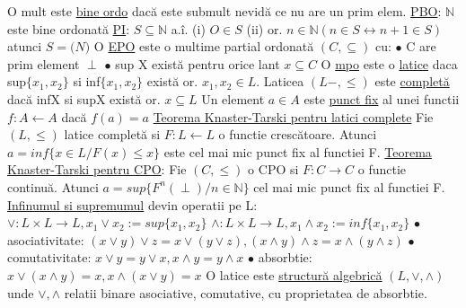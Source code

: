 \documentclass[8pt,twocolumn]{extarticle}
\begin{document}
	O mult este \underline{bine ordo} dacă este submult nevidă ce nu are un prim elem. \newline
	\underline{PBO}: $\mathbb{N}$ este bine ordonată \newline
	\underline{PI}: $S \subseteq \mathbb{N}$ a.î. (i) $O \in S$ \newline
	(ii) or. $n \in \mathbb{N} (n \in S \leftrightarrow n + 1 \in S)$ atunci $S = \mathbb(N)$ \newline
	O \underline{EPO} este o multime partial ordonată $(C, \subseteq)$ cu: \newline
	$\bullet$ C are prim element $\perp$ $\bullet$ sup X există pentru orice lant $x \subseteq C$ \newline
	O \underline{mpo} este o \underline{latice} daca sup$\{x_{1}, x_{2}\}$ si inf$\{x_{1}, x_{2}\}$ există or. $x_{1}, x_{2} \in L$. Laticea $(L-, \leq)$ este \underline{completă} dacă infX si supX există or. $x \subseteq L$ \newline
	Un element $a \in A$ este \underline{punct fix} al unei functii $f: A \leftarrow A$ dacă $f(a) = a$ \newline
	\underline{Teorema Knaster-Tarski pentru latici complete} \newline
	Fie $(L, \leq)$ latice completă si $F: L \leftarrow L$ o functie crescătoare. Atunci $a = inf\{ x \in L / F(x) \leq x \}$ este cel mai mic punct fix al functiei F. \newline
	\underline{Teorema Knaster-Tarski pentru CPO}: \newline
	Fie $(C, \leq)$ o CPO si $F: C \rightarrow C$ o functie continuă. Atunci $a = sup\{ F^{n}(\perp) / n \in \mathbb{N} \}$ cel mai mic punct fix al functiei F. \newline
	\underline{Infinumul si supremumul} devin operatii pe L: \newline
	$\vee : L \times L \rightarrow L, x_{1} \vee x_{2} := sup\{ x_{1}, x_{2} \}$ \newline
	$\wedge : L \times L \rightarrow L, x_{1} \wedge x_{2} := inf\{ x_{1}, x_{2} \}$ \newline
	$\bullet$ asociativitate: $(x \vee y) \vee z = x \vee (y \vee z), (x \wedge y) \wedge z = x \wedge (y \wedge z)$ \newline
	$\bullet$ comutativitate: $x \vee y = y \vee x, x \wedge y = y \wedge x$ \newline
	$\bullet$ absorbtie: $x \vee (x \wedge y) = x, x \wedge (x \vee y) = x$ \newline
	O latice este \underline{structură algebrică} $(L, \vee, \wedge)$ unde $\vee, \wedge$ relatii binare asociative, comutative, cu proprietatea de absorbtie. \newline
\end{document}
